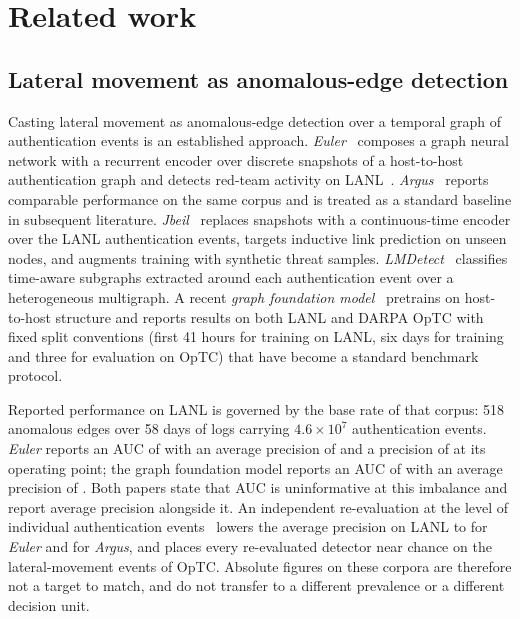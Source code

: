 \section{Related work}
\label{sec:related}

\subsection{Lateral movement as anomalous-edge detection}

Casting lateral movement as anomalous-edge detection over a temporal graph of
authentication events is an established approach. \textit{Euler}~\cite{euler} composes
a graph neural network with a recurrent encoder over discrete snapshots of a
host-to-host authentication graph and detects red-team activity on LANL~\cite{lanl}.
\textit{Argus}~\cite{argus} reports comparable performance on the same corpus and is
treated as a standard baseline in subsequent literature. \textit{Jbeil}~\cite{jbeil} replaces
snapshots with a continuous-time encoder over the LANL authentication events, targets
inductive link prediction on unseen nodes, and augments training with synthetic threat
samples. \textit{LMDetect}~\cite{lmdetect}
classifies time-aware subgraphs extracted around each authentication event over a
heterogeneous multigraph. A recent \textit{graph foundation model}~\cite{gfm} pretrains
on host-to-host structure and reports results on both LANL and DARPA OpTC with fixed
split conventions (first 41 hours for training on LANL, six days for training and
three for evaluation on OpTC) that have become a standard benchmark protocol.

Reported performance on LANL is governed by the base rate of that corpus: 518 anomalous
edges over 58 days of logs carrying $4.6\times10^{7}$ authentication events. \textit{Euler}
reports an AUC of \LitEulerAuc{} with an average precision of \LitEulerAp{} and a precision of
\LitEulerPrec{} at its operating point; the graph foundation model reports an AUC of \LitGfmAuc{}
with an average precision of \LitGfmAp{}. Both papers state that AUC is uninformative at this
imbalance and report average precision alongside it. An independent re-evaluation at the level
of individual authentication events~\cite{larroche26} lowers the average precision on LANL to
\LitReEulerAp{} for \textit{Euler} and \LitReArgusAp{} for \textit{Argus}, and places every
re-evaluated detector near chance on the lateral-movement events of OpTC. Absolute figures on
these corpora are therefore not a target to match, and do not transfer to a different
prevalence or a different decision unit.

